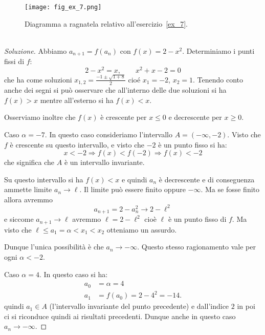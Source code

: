 \newsavebox{\qrexsette}
\begin{figure}
   \begin{center}
    \texttt{[image: fig\_ex\_7.png]}
  \end{center}
  \caption{Diagramma a ragnatela relativo
    all'esercizio~\ref{ex_7}.\\\\
    \usebox{\qrexsette}}
  \label{fig_ex_7}
\end{figure}

\begin{proof}[Soluzione]
  Abbiamo $a_{n+1} = f(a_n)$ con $f(x) = 2-x^2$. Determiniamo i punti
  fissi di $f$:
  \[
  2-x^2 = x, \qquad x^2 + x - 2 = 0
  \]
  che ha come soluzioni $x_{1,2} = \frac{-1\pm\sqrt{1+8}}{2}$ cioé
  $x_1 = -2$, $x_2 = 1$. Tenendo conto anche dei segni si può
  osservare che all'interno delle due soluzioni si ha $f(x)>x$ mentre
  all'esterno si ha $f(x)<x$.

  Osserviamo inoltre che $f(x)$ è crescente per
  $x\le 0$ e decrescente per $x\ge 0$.

  Caso $\alpha=-7$. In questo caso consideriamo l'intervallo
  $A=(-\infty, -2)$. Visto che $f$ è crescente su questo intervallo,
  e visto che $-2$ è un punto fisso si ha:
  \[
  x < -2 \Rightarrow f(x) < f(-2) \Rightarrow f(x) < -2
  \]
  che significa che $A$ è un intervallo invariante.

  Su questo intervallo si ha $f(x)<x$ e quindi $a_n$ è decrescente e
  di conseguenza ammette limite $a_n\to \ell$. Il limite può essere
  finito oppure $-\infty$. Ma se fosse finito allora avremmo
  \[
  a_{n+1} = 2 - a_n^2 \to 2 - \ell^2
  \]
  e siccome $a_{n+1}\to \ell$ avremmo $\ell = 2 - \ell^2$ cioè $\ell$
  è un punto fisso di $f$. Ma visto che $\ell \le a_1 = \alpha < x_1 <
  x_2$ otteniamo un assurdo.

  Dunque l'unica possibilità è che $a_n \to -\infty$. Questo
  stesso ragionamento vale per ogni $\alpha<-2$.

  Caso $\alpha=4$. In questo caso si ha:
  \begin{align*}
    a_0 &= \alpha = 4\\
    a_1 &= f(a_0) = 2 - 4^2 = -14.
  \end{align*}
  quindi $a_1 \in A$ (l'intervallo invariante del punto precedente) e
  dall'indice $2$ in poi ci si riconduce quindi ai risultati
  precedenti. Dunque anche in questo caso $a_n \to -\infty$.


\end{proof}
